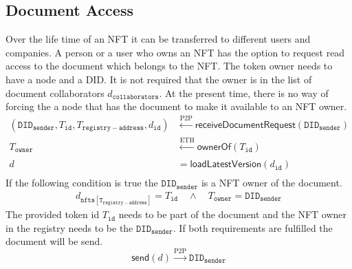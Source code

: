 \subsection{Document Access}
Over the life time of an NFT it can be transferred to different users and companies. A person or a user who owns an NFT has the option to request read access to the document which belongs to the NFT. The token owner needs to have a node and a DID. It is not required that the owner is in the list of document collaborators $d_{\mathtt{collaborators}}$.
At the present time, there is no way of forcing the a node that has the document to make it available to an NFT owner.
\begin{equation}
    \begin{split}
            (\mathtt{DID_{sender}},T_{\mathtt{id}},T_{\mathtt{registry-address}},d_{\mathtt{id}})& \xleftarrow[]{\text{P2P}}  \mathsf{receiveDocumentRequest}(\mathtt{DID_{sender}}) \\
            T_{\mathtt{owner}}  & \xleftarrow[]{\text{ETH}} \mathsf{ownerOf}(T_{\texttt{id}}) \\
               d    &= \mathsf{loadLatestVersion}({d}_{\mathtt{id}}) \\
    \end{split}
\end{equation}
If the following condition is true the $\mathtt{DID_{sender}}$ is a NFT owner of the document.
\begin{equation}
    \begin{split}
     d_{\mathtt{nfts[T_{registry-address}]}} = T_{\mathtt{id}} \quad \land \quad T_{\mathtt{owner}} = \mathtt{DID_{sender}}
    \end{split}
\end{equation}
The provided token id $T_{\mathtt{id}}$ needs to be part of the document and the NFT owner in the registry needs to be the $\mathtt{DID_{sender}}$. If both requirements are fulfilled the document will be send.
\begin{equation}
      \mathsf{send}(d) \xrightarrow[]{\text{P2P}} \mathtt{DID_{sender}}
\end{equation}


